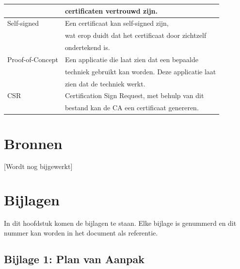 \documentclass[]{article}
\begin{document}
\begin{longtable}{|| l | l ||}
                     & certificaten vertrouwd  zijn.                        \\\hline
    Self-signed      & Een certificaat kan self-signed zijn,                \\
                     & wat erop duidt dat het certificaat door zichtzelf    \\
                     & ondertekend is.                                      \\\hline
    Proof-of-Concept & Een applicatie die laat zien dat een bepaalde        \\
                     & techniek gebruikt kan worden. Deze applicatie laat   \\
                     & zien dat de techniek werkt.                   \\\hline
    CSR              & Certification Sign Request, met behulp van dit       \\
                     & bestand kan de CA een certificaat genereren.         \\\hline
\end{longtable}

\newpage
\section{Bronnen}
[Wordt nog bijgewerkt]

\newpage
\section{Bijlagen}

In dit hoofdstuk komen de bijlagen te staan. Elke bijlage is genummerd en
dit nummer kan worden in het document als referentie.

\subsection{Bijlage 1: Plan van Aanpak}

\newpage
\end{document}
